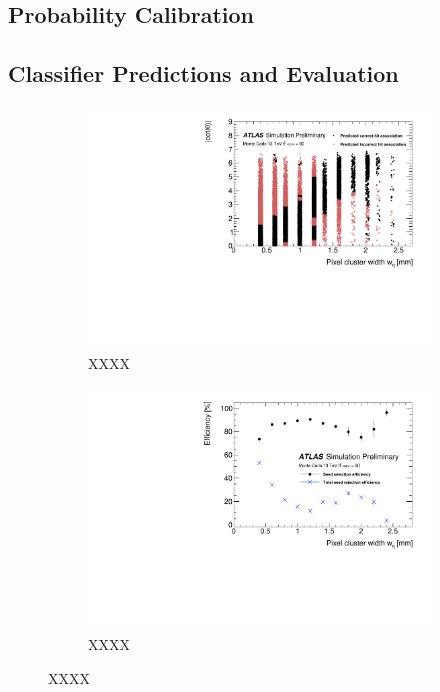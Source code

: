\subsection{Probability Calibration}

\subsection{Classifier Predictions and Evaluation}


\begin{figure}[!htbp]
\centering
    \begin{subfigure}[a]{0.86\textwidth}
        \includegraphics[width=\linewidth]{images/4-ml-based-predictor/scatter_kde_predictions.pdf}
        \caption{XXXX}
    \end{subfigure}
    \hfill
    \begin{subfigure}[b]{0.86\textwidth}
        \centering
        \includegraphics[width=\linewidth]{images/4-ml-based-predictor/triplet_eff_metrics.pdf}
        \caption{XXXX}
    \end{subfigure}
\caption{XXXX}
\label{fig:predictions-pixel-barrel-and-triplet-efficiencies}
\end{figure}


